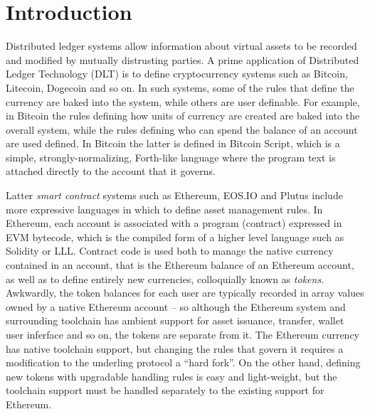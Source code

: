 
\section{Introduction}
Distributed ledger systems allow information about virtual assets to be recorded and modified by mutually distrusting parties. A prime application of Distributed Ledger Technology (DLT) is to define cryptocurrency systems such as Bitcoin, Litecoin, Dogecoin and so on. In such systems, some of the rules that define the currency are baked into the system, while others are user definable. For example, in Bitcoin the rules defining how units of currency are created are baked into the overall system, while the rules defining who can spend the balance of an account are used defined. In Bitcoin the latter is defined in Bitcoin Script, which is a simple, strongly-normalizing, Forth-like language where the program text is attached directly to the account that it governs.

Latter \emph{smart contract} systems such as Ethereum, EOS.IO and Plutus include more expressive languages in which to define asset management rules. In Ethereum, each account is associated with a program (contract) expressed in EVM bytecode, which is the compiled form of a higher level language such as Solidity or LLL. Contract code is used both to manage the native currency contained in an account, that is the Ethereum balance of an Ethereum account, as well as to define entirely new currencies, colloquially known as \emph{tokens}. Awkwardly, the token balances for each user are typically recorded in array values owned by a native Ethereum account -- so although the Ethereum system and surrounding toolchain has ambient support for asset issuance, transfer, wallet user inferface and so on, the tokens are separate from it. The Ethereum currency has native toolchain support, but changing the rules that govern it requires a modification to the underling protocol a ``hard fork''. On the other hand, defining new tokens with upgradable handling rules is easy and light-weight, but the toolchain support must be handled separately to the existing support for Ethereum.

